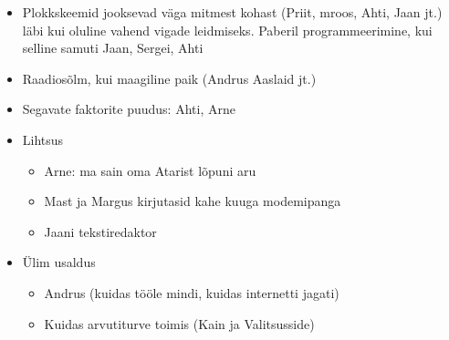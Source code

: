 \documentclass{tufte-book}
\begin{document}
\begin{itemize}
	\item Plokkskeemid jooksevad väga mitmest kohast (Priit, mroos, Ahti, Jaan jt.) läbi kui oluline vahend vigade leidmiseks. Paberil programmeerimine, kui selline samuti Jaan, Sergei, Ahti
	\item Raadiosõlm, kui maagiline paik (Andrus Aaslaid jt.)
	\item Segavate faktorite puudus: Ahti, Arne
	\item Lihtsus
	\begin{itemize}
		\item Arne: ma sain oma Atarist lõpuni aru
		\item Mast ja Margus kirjutasid kahe kuuga modemipanga
		\item Jaani tekstiredaktor
	\end{itemize}
	\item Ülim usaldus
	\begin{itemize}
		\item Andrus (kuidas tööle mindi, kuidas internetti jagati)
		\item Kuidas arvutiturve toimis (Kain ja Valitsusside)
	\end{itemize}
\end{itemize}




\backmatter





\printindex[ppl]
\printindex
\end{document}
